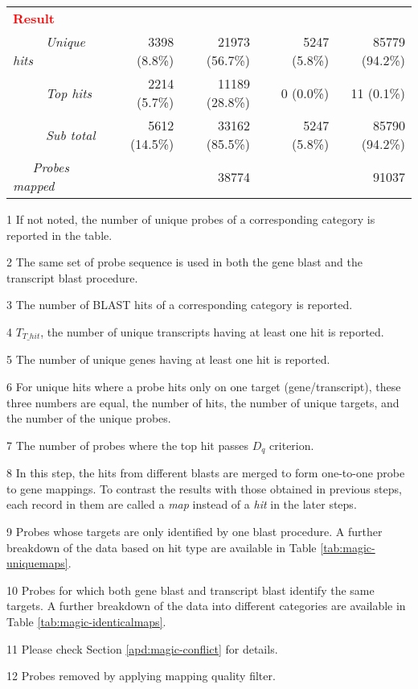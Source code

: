 \begin{table}
\begin{threeparttable}
\begin{footnotesize}
\begin{tabular}{@{}p{3cm}r|rcr|r}
		\multicolumn{6}{l}{\textcolor{red}{\bf Result}} \\[.2ex]
	{\it ~~~~~Unique hits} & 3398 (8.8\%) & 21973 (56.7\%) && 5247 (5.8\%) & 
	85779 (94.2\%) \\
	{\it ~~~~~Top hits} & 2214 (5.7\%) & 11189 (28.8\%) && 0 (0.0\%) & 11 
	(0.1\%) \\
	{\it ~~~~~Sub total} & 5612 (14.5\%) & 33162 (85.5\%) && 5247 (5.8\%) & 
	85790 (94.2\%) \\
	{\it ~~~Probes mapped} & \multicolumn{2}{r}{38774} && 
	\multicolumn{2}{r}{91037} \\
	\bottomrule
	\end{tabular}
	\begin{tablenotes}
	\item[1] If not noted, the number of unique probes of a corresponding 
		category is reported in the table.
	\item[2] The same set of probe sequence is used in both the gene blast and 	
		the transcript blast procedure.
	\item[3] The number of BLAST hits of a corresponding category is reported.
	\item[4] $T_{T\_hit}$, the number of unique transcripts having at least one 
		hit is reported.
	\item[5] The number of unique genes having at least one hit is reported.
	\item[6] For unique hits where a probe hits only on one target 
		(gene/transcript), these three numbers are equal, the number of hits, 
		the number of unique targets, and the number of the unique probes.
	\item[7] The number of probes where the top hit passes $D_q$ criterion.
	\item[8] In this step, the hits from different blasts are merged to form 
		one-to-one probe to gene mappings. To contrast the results with those
		obtained in previous steps, each record in them are called a 
		\textit{map} instead of a \textit{hit} in the later steps.
	\item[9] Probes whose targets are only identified by one blast procedure. A 
		further breakdown of the data based on hit type are available in Table 
		\ref{tab:magic-uniquemaps}.
	\item[10] Probes for which both gene blast and transcript blast identify the
	 	same targets. A further breakdown of the data into different 
	 	categories are available in Table \ref{tab:magic-identicalmaps}.
	\item[11] Please check Section \ref{apd:magic-conflict} for details.
	\item[12] Probes removed by applying mapping quality filter.
	\end{tablenotes}
	\end{footnotesize}
	\end{threeparttable}
\end{table}



